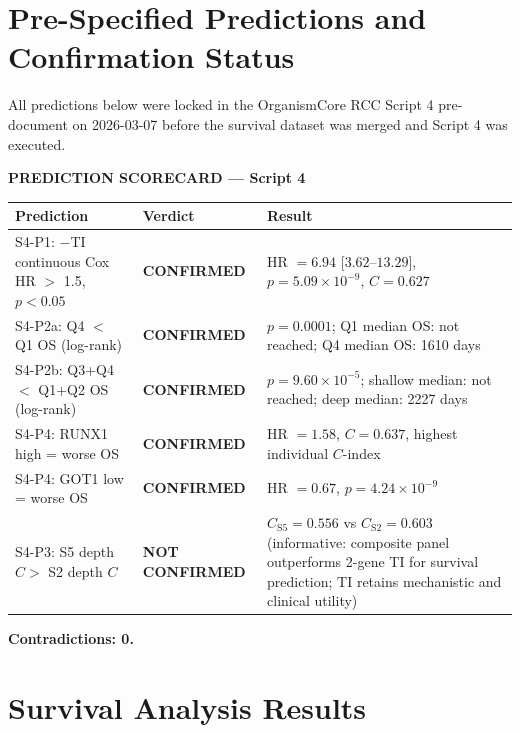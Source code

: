 \documentclass[11pt, a4paper]{article}
\begin{document}
\section{Pre-Specified Predictions and
Confirmation Status}
\label{sec:predictions}

All predictions below were locked in the
OrganismCore RCC Script 4 pre-document
on 2026-03-07 before the survival dataset
was merged and Script 4 was executed.

\begin{mdframed}[backgroundcolor=findingbox,
                 linecolor=green!50!black,
                 linewidth=1.5pt]
\textbf{PREDICTION SCORECARD --- Script 4}

\medskip
\begin{tabular}{@{}p{5.5cm}p{2cm}p{5cm}@{}}
\toprule
\textbf{Prediction} &
\textbf{Verdict} &
\textbf{Result} \\
\midrule
S4-P1: $-$TI continuous Cox
HR $>$ 1.5, $p < 0.05$ &
\textbf{CONFIRMED} &
HR $= 6.94$ $[3.62$--$13.29]$,
$p = 5.09 \times 10^{-9}$,
$C = 0.627$ \\[0.5em]
S4-P2a: Q4 $<$ Q1 OS
(log-rank) &
\textbf{CONFIRMED} &
$p = 0.0001$;
Q1 median OS: not reached;
Q4 median OS: 1610 days \\[0.5em]
S4-P2b: Q3+Q4 $<$ Q1+Q2 OS
(log-rank) &
\textbf{CONFIRMED} &
$p = 9.60 \times 10^{-5}$;
shallow median: not reached;
deep median: 2227 days \\[0.5em]
S4-P4: RUNX1 high = worse OS &
\textbf{CONFIRMED} &
HR $= 1.58$, $C = 0.637$,
highest individual $C$-index \\[0.5em]
S4-P4: GOT1 low = worse OS &
\textbf{CONFIRMED} &
HR $= 0.67$, $p = 4.24
\times 10^{-9}$ \\[0.5em]
S4-P3: S5 depth $C >$
S2 depth $C$ &
\textbf{NOT CONFIRMED} &
$C_\text{S5} = 0.556$
vs $C_\text{S2} = 0.603$
(informative: composite
panel outperforms 2-gene TI
for survival prediction;
TI retains mechanistic and
clinical utility) \\
\bottomrule
\end{tabular}

\medskip
\textbf{Contradictions: 0.}
\end{mdframed}

\section{Survival Analysis Results}
\label{sec:survival}
\end{document}
